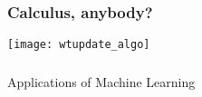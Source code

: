 \begin{frame}[fragile]\frametitle{Calculus, anybody?}

			\begin{center}
			\texttt{[image: wtupdate\_algo]}
			\end{center}
\end{frame}

%

\begin{frame}[fragile]\frametitle{}
\begin{center}
{\Large Applications of Machine Learning}
\end{center}
\end{frame}


